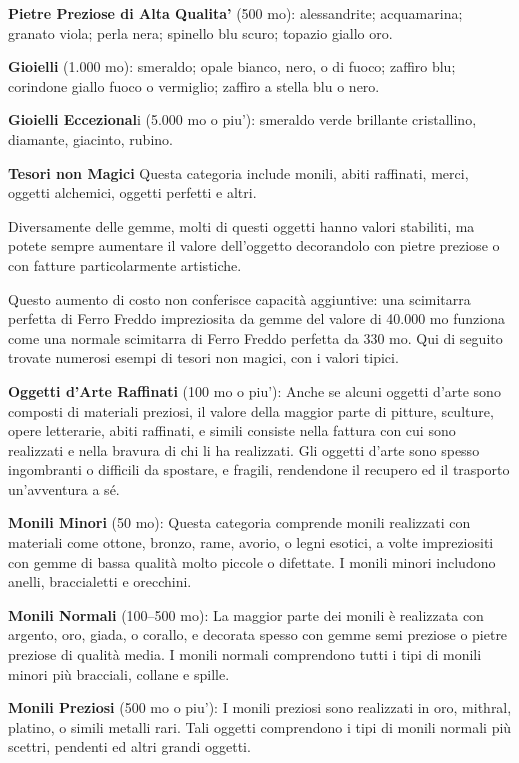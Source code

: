 \documentclass[a4paper,11pt,twoside,openany]{book}
\begin{document}
{\textbf{Pietre Preziose di Alta Qualita'} (500 mo): alessandrite; acquamarina; granato viola; perla nera; spinello blu scuro; topazio giallo oro.

\textbf{Gioielli} (1.000 mo): smeraldo; opale bianco, nero, o di fuoco; zaffiro blu; corindone giallo fuoco o vermiglio; zaffiro a stella blu o nero.

\textbf{Gioielli Eccezional}i (5.000 mo o piu'): smeraldo verde brillante cristallino, diamante, giacinto, rubino.

\textbf{Tesori non Magici} Questa categoria include monili, abiti raffinati, merci, oggetti alchemici, oggetti perfetti e altri.

Diversamente delle gemme, molti di questi oggetti hanno valori stabiliti, ma potete sempre aumentare il valore dell'oggetto decorandolo con pietre preziose o con fatture particolarmente artistiche.

Questo aumento di costo non conferisce capacità aggiuntive: una scimitarra perfetta di Ferro Freddo impreziosita da gemme del valore di 40.000 mo funziona come una normale scimitarra di Ferro Freddo perfetta da 330 mo. Qui di seguito trovate numerosi esempi di tesori non magici, con i valori tipici.

\textbf{Oggetti d'Arte Raffinati} (100 mo o piu'): Anche se alcuni oggetti d'arte sono composti di materiali preziosi, il valore della maggior parte di pitture, sculture, opere letterarie, abiti raffinati, e simili consiste nella fattura con cui sono realizzati e nella bravura di chi li ha realizzati. Gli oggetti d'arte sono spesso ingombranti o difficili da spostare, e fragili, rendendone il recupero ed il trasporto un'avventura a sé.

\textbf{Monili Minori} (50 mo): Questa categoria comprende monili realizzati con materiali come ottone, bronzo, rame, avorio, o legni esotici, a volte impreziositi con gemme di bassa qualità molto piccole o difettate. I monili minori includono anelli, braccialetti e orecchini.

\textbf{Monili Normali} (100--500 mo): La maggior parte dei monili è realizzata con argento, oro, giada, o corallo, e decorata spesso con gemme semi preziose o pietre preziose di qualità media. I monili normali comprendono tutti i tipi di monili minori più bracciali, collane e spille.

\textbf{Monili Preziosi} (500 mo o piu'): I monili preziosi sono realizzati in oro, mithral, platino, o simili metalli rari. Tali oggetti comprendono i tipi di monili normali più scettri, pendenti ed altri grandi oggetti. 

}
\end{document}
